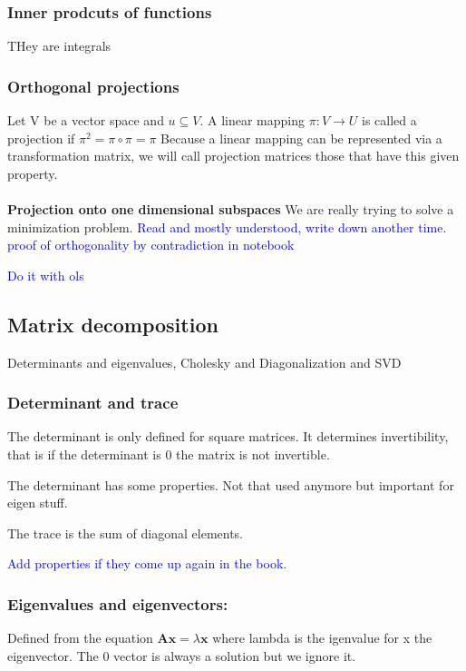 \documentclass{article}
\newcommand{\tblue}[1]{\textcolor{blue}{#1}}
\begin{document}
\subsubsection{Inner prodcuts of functions}
THey are integrals


\subsubsection{Orthogonal projections}
Let V be a vector space and $u \subseteq V$. A linear mapping $\pi: V \rightarrow U$ is called a projection
if $\pi ^2 = \pi \circ \pi = \pi $ Because a linear mapping can be represented via a transformation matrix,
we will call projection matrices those that have this given property.
\\
\\
\textbf{Projection onto one dimensional subspaces}
We are really trying to solve a minimization problem.
\tblue{Read and mostly understood, write down another time. proof of orthogonality by contradiction in notebook}

\tblue{Do it with ols}

\subsection{Matrix decomposition}
Determinants and eigenvalues, Cholesky and Diagonalization and SVD

\subsubsection{Determinant and trace}
The determinant is only defined for square matrices. It determines invertibility, that is if the
determinant is 0 the matrix is not invertible.

The determinant has some properties. Not that used anymore but important for eigen stuff.

The trace is the sum of diagonal elements.

\tblue{Add properties if they come up again in the book.}

\subsubsection{Eigenvalues and eigenvectors:}

Defined from the equation $ \textbf{A}\textbf{x} = \lambda \textbf{x} $
where lambda is the igenvalue for x the eigenvector. The 0 vector is always a solution but we ignore it.
\end{document}
